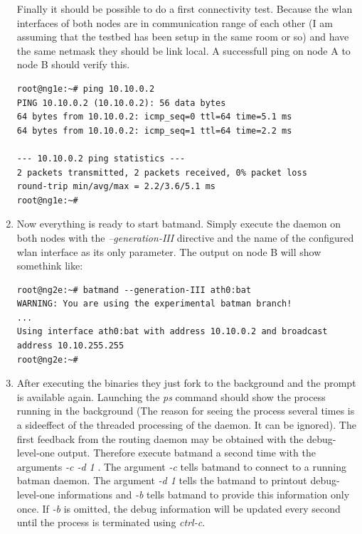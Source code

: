 \documentclass[11pt]{article}
\begin{document}
\begin{enumerate}
Finally it should be possible to do a first connectivity test. 
%
Because the wlan interfaces of both nodes are in communication range of each other (I am assuming that the testbed has been setup in the same room or so) and have the same netmask they should be link local. A successfull ping on node A to node B should verify this.
\begin{small} \begin{verbatim}
root@ng1e:~# ping 10.10.0.2
PING 10.10.0.2 (10.10.0.2): 56 data bytes
64 bytes from 10.10.0.2: icmp_seq=0 ttl=64 time=5.1 ms
64 bytes from 10.10.0.2: icmp_seq=1 ttl=64 time=2.2 ms

--- 10.10.0.2 ping statistics ---
2 packets transmitted, 2 packets received, 0% packet loss
round-trip min/avg/max = 2.2/3.6/5.1 ms
root@ng1e:~# 
\end{verbatim} \end{small}

\item Now everything is ready to start batmand. Simply execute the daemon on both nodes with the \emph{--generation-III} directive and the name of the configured wlan interface as its only parameter. The output on node B will show somethink like:

\begin{small} \begin{verbatim}
root@ng2e:~# batmand --generation-III ath0:bat
WARNING: You are using the experimental batman branch!
...
Using interface ath0:bat with address 10.10.0.2 and broadcast address 10.10.255.255
root@ng2e:~#
\end{verbatim} \end{small}

\item After executing the binaries they just fork to the background and the prompt is available again. 
Launching the \emph{ps} command should show the process running in the background (The reason for seeing the process several times is a sideeffect of the threaded processing of the daemon. It can be ignored). 
The first feedback from the routing daemon may be obtained with the debug-level-one output. 
Therefore execute batmand a second time with the arguments \emph{ -c -d 1 }. 
The argument \emph{-c} tells batmand to connect to a running batman daemon. 
The argument \emph{-d 1} tells the batmand to printout debug-level-one informations and 
\emph{-b} tells batmand to provide this information only once. 
If \emph{-b} is omitted, the debug information will be updated every second until the process is terminated using \emph{ctrl-c}.


\end{enumerate}
\end{document}
